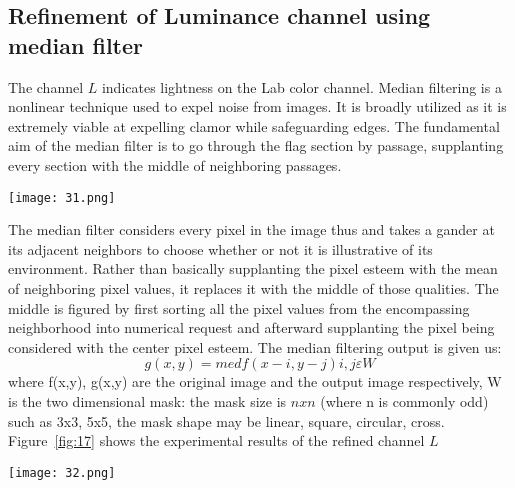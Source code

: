\documentclass[doctor,english,listoffigures,listoftables]{thesis-uestc}
\begin{document}
\subsection{Refinement of Luminance channel using median filter}
The channel $L$ indicates lightness on the Lab color channel. Median filtering is a nonlinear technique used to
expel noise from images. It is broadly utilized as it is extremely viable at expelling clamor while safeguarding
edges. The fundamental aim of the median filter is to go through the flag section by passage, supplanting every
section with the middle of neighboring passages.
\begin{figure*}
	\centering
	\texttt{[image: 31.png]}
	\caption{Results of Color Channel b}
	\label{fig:16}
\end{figure*}

 The median filter considers every pixel in the image thus and takes a gander at its adjacent neighbors to choose whether or not it is illustrative of its environment. Rather than basically supplanting the pixel esteem with the mean of neighboring pixel values, it replaces it with the middle of those qualities. The middle is figured by first sorting all the pixel values from the encompassing neighborhood into numerical request and afterward supplanting the pixel being considered with the center pixel esteem. The median filtering output is given us:
\begin{equation}
g(x,y)= med{f(x-i,y-j)i,j \varepsilon W}
\end{equation} 
where f(x,y), g(x,y) are the original image and the output image respectively, W is the two dimensional mask: the mask size is $nxn$ (where n is commonly odd) such as 3x3, 5x5, the mask shape may be linear, square, circular, cross. Figure~\ref{fig:17} shows the experimental results of the refined channel $L$

\begin{figure*}[!htb]
	\centering
	\texttt{[image: 32.png]}
	\caption{Results of Luminance Channel L.}
	\label{fig:17}
\end{figure*}
\end{document}
